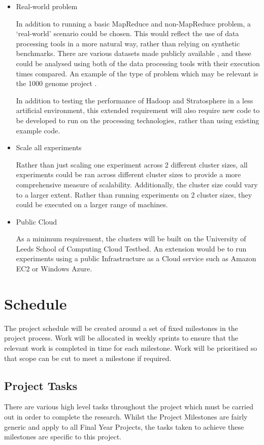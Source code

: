 \begin{itemize}
	\item Real-world problem

	In addition to running a basic MapReduce and non-MapReduce problem, a `real-world' scenario could be chosen. This would reflect the use of data processing tools in a more natural way, rather than relying on synthetic benchmarks. There are various datasets made publicly available \cite{publicAmazonData}, and these could be analysed using both of the data processing tools with their execution times compared. An example of the type of problem which may be relevant is the 1000 genome project \cite{genomeData}.

	In addition to testing the performance of Hadoop and Stratosphere in a less artificial environment, this extended requirement will also require new code to be developed to run on the processing technologies, rather than using existing example code.

	\item Scale all experiments

	Rather than just scaling one experiment across 2 different cluster sizes, all experiments could be ran across different cluster sizes to provide a more comprehensive measure of scalability. Additionally, the cluster size could vary to a larger extent. Rather than running experiments on 2 cluster sizes, they could be executed on a larger range of machines.

	\item Public Cloud

	As a minimum requirement, the clusters will be built on the University of Leeds School of Computing Cloud Testbed. An extension would be to run experiments using a public Infrastructure as a Cloud service such as Amazon EC2 or Windows Azure. 
\end{itemize}

\section{Schedule}
The project schedule will be created around a set of fixed milestones in the project process. Work will be allocated in weekly sprints to ensure that the relevant work is completed in time for each milestone. Work will be prioritised so that scope can be cut to meet a milestone if required.

\subsection{Project Tasks}
There are various high level tasks throughout the project which must be carried out in order to complete the research. Whilst the Project Milestones are fairly generic and apply to all Final Year Projects, the tasks taken to achieve these milestones are specific to this project.

